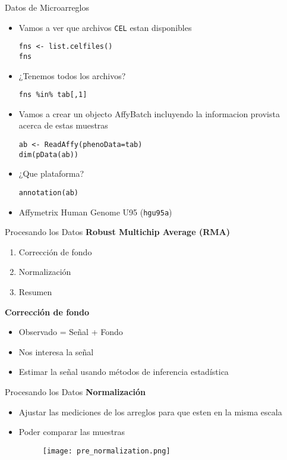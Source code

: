 \documentclass{beamer}
\begin{document}
\begin{frame}[fragile]{Datos de Microarreglos}
\begin{itemize}
\item Vamos a ver que archivos \verb=CEL= estan disponibles
\begin{verbatim}
fns <- list.celfiles()
fns
\end{verbatim}
\item ¿Tenemos todos los archivos?
\begin{verbatim}
fns %in% tab[,1]
\end{verbatim}
\item Vamos a crear un objecto AffyBatch incluyendo la informacion provista acerca de estas muestras
\begin{verbatim}
ab <- ReadAffy(phenoData=tab)
dim(pData(ab))
\end{verbatim}
\item ¿Que plataforma?
\begin{verbatim}
annotation(ab)
\end{verbatim}
\item Affymetrix Human Genome U95 (\texttt{hgu95a})
\end{itemize}
\end{frame}


\begin{frame}[fragile]{Procesando los Datos}
\textbf{Robust Multichip Average (RMA)}
\begin{enumerate}
\item Corrección de fondo
\item Normalización
\item Resumen
\end{enumerate}
\textbf{Corrección de fondo}
\begin{itemize}
\item Observado = Señal + Fondo
\item Nos interesa la señal
\item Estimar la señal usando métodos de inferencia estadística
\end{itemize}
\end{frame}


\begin{frame}[fragile]{Procesando los Datos}
\textbf{Normalización}
\begin{itemize}
\item Ajustar las mediciones de los arreglos para que esten en la misma escala
\item Poder comparar las muestras
\begin{figure}[H]
\centering
\texttt{[image: pre\_normalization.png]}
\end{figure}
\end{itemize}
\end{frame}
\end{document}
